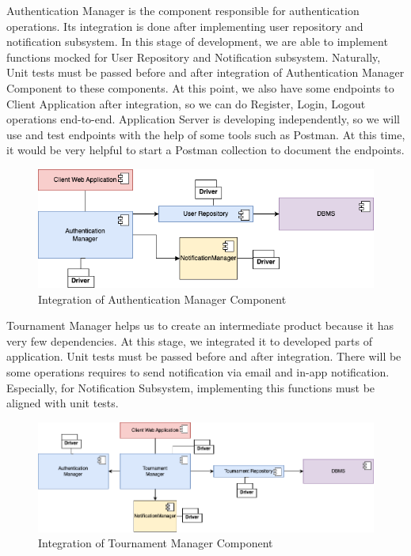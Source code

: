 \newpage
\indent Authentication Manager is the component responsible for authentication operations. Its integration is done after implementing user repository and notification subsystem. In this stage of development, we are able to implement functions mocked for User Repository and Notification subsystem. Naturally, Unit tests must be passed before and after integration of Authentication Manager Component to these components. At this point, we also have some endpoints to Client Application after integration, so we can do Register, Login, Logout operations end-to-end. Application Server is developing independently, so we will use and test endpoints with the help of some tools such as Postman. At this time, it would be very helpful to start a Postman collection to document the endpoints.

\begin{figure}[H]
    \centering
    \includegraphics[width=\linewidth]{Images/integration/integration_3.drawio.png}
    \caption{Integration of Authentication Manager Component}
\end{figure}

\newpage
\indent Tournament Manager helps us to create an intermediate product because it has very few dependencies. At this stage, we integrated it to developed parts of application. Unit tests must be passed before and after integration. There will be some operations requires to send notification via email and in-app notification. Especially, for Notification Subsystem, implementing this functions must be aligned with unit tests. 

\begin{figure}[H]
    \centering
    \includegraphics[width=\linewidth]{Images/integration/integration_4.drawio.png}
    \caption{Integration of Tournament Manager Component}
\end{figure}

